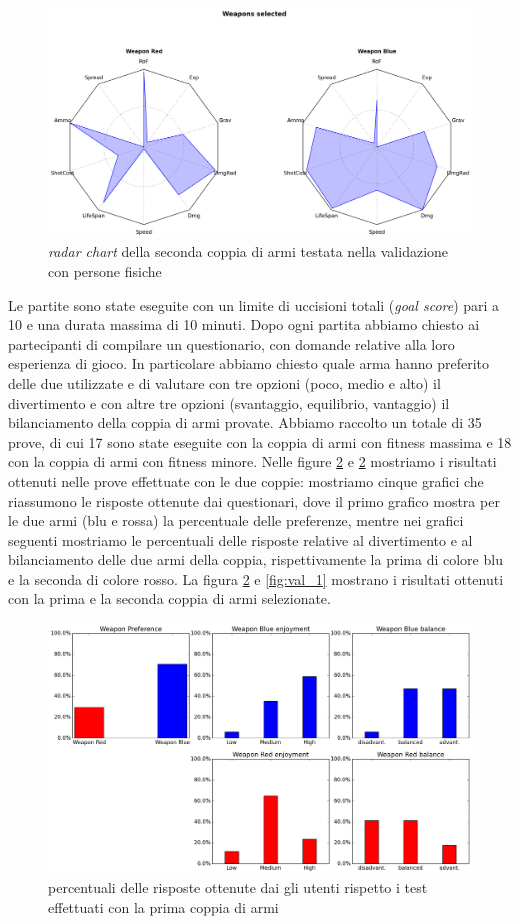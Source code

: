 \documentclass[12pt, italian]{toptesi}
\begin{document}
\begin{figure}[htp]
\centering
\includegraphics[width=1.0\textwidth]{weap_test_2}
\caption{\emph{radar chart} della seconda coppia di armi testata nella validazione con persone fisiche}
\label{fig:weap_test_2}
\end{figure}
Le partite sono state eseguite con un limite di uccisioni totali (\emph{goal score}) pari a 10 e una durata massima di 10 minuti.
Dopo ogni partita abbiamo chiesto ai partecipanti di compilare un questionario, con domande relative alla loro esperienza di gioco.
In particolare abbiamo chiesto quale arma hanno preferito delle due utilizzate e di valutare con tre opzioni (poco, medio e alto) il divertimento e con altre tre opzioni (svantaggio, equilibrio, vantaggio) il bilanciamento della coppia di armi provate.
Abbiamo raccolto un totale di 35 prove, di cui 17 sono state eseguite con la coppia di armi con fitness massima e 18 con la coppia di armi con fitness minore.
Nelle figure \ref{fig:val_2} e \ref{fig:val_2} mostriamo i risultati ottenuti nelle prove effettuate con le due coppie: mostriamo cinque grafici che riassumono le risposte ottenute dai questionari, dove il primo grafico mostra per le due armi (blu e rossa) la percentuale delle preferenze, mentre nei grafici seguenti mostriamo le percentuali delle risposte relative al divertimento e al bilanciamento delle due armi della coppia, rispettivamente la prima di colore blu e la seconda di colore rosso.
La figura \ref{fig:val_2} e \ref{fig:val_1} mostrano i risultati ottenuti con la prima e la seconda coppia di armi selezionate.
\begin{figure}[htp]
\centering
\includegraphics[width=1.0\textwidth]{validation_2}
\caption{percentuali delle risposte ottenute dai gli utenti rispetto i test effettuati con la prima coppia di armi}
\label{fig:val_2}
\end{figure}
\end{document}
